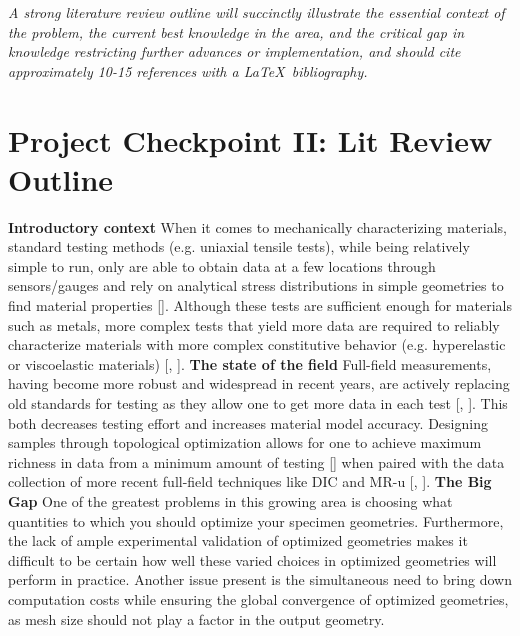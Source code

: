 \textit{A strong literature review outline will succinctly illustrate the essential context of the problem, the current best knowledge in the area, and the critical gap in knowledge restricting further advances or implementation, and should cite approximately 10-15 references with a \LaTeX ~bibliography.}

\newpage
\section*{Project Checkpoint II: Lit Review Outline}
\begin{outline}
    \1 \textbf{Introductory context}
        \2 When it comes to mechanically characterizing materials, standard testing methods (e.g. uniaxial tensile tests), while being relatively simple to run, only are able to obtain data at a few locations through sensors/gauges and rely on analytical stress distributions in simple geometries to find material properties [\cite{OlderRevMatlTesting}]. Although these tests are sufficient enough for materials such as metals, more complex tests that yield more data are required to reliably characterize materials with more complex constitutive behavior (e.g. hyperelastic or viscoelastic materials) [\cite{FunctionalMRI}, \cite{TheVirtualFieldsMethod}].
    \1 \textbf{The state of the field}
        \2 Full-field measurements, having become more robust and widespread in recent years, are actively replacing old standards for testing as they allow one to get more data in each test [\cite{MRuPaper1}, \cite{DICbook}]. This both decreases testing effort and increases material model accuracy.
        \2 Designing samples through topological optimization allows for one to achieve maximum richness in data from a minimum amount of testing [\cite{TopOptEntropyBased}] when paired with the data collection of more recent full-field techniques like DIC and MR-u [\cite{BriefRevMatlTesting}, \cite{nikolov2025variationmatchingsensitivitybasedvirtualfields}].
    \1 \textbf{The Big Gap}
        \2 One of the greatest problems in this growing area is choosing what quantities to which you should optimize your specimen geometries. Furthermore, the lack of ample experimental validation of optimized geometries makes it difficult to be certain how well these varied choices in optimized geometries will perform in practice.
        \2 Another issue present is the simultaneous need to bring down computation costs while ensuring the global convergence of optimized geometries, as mesh size should not play a factor in the output geometry. 
\end{outline}